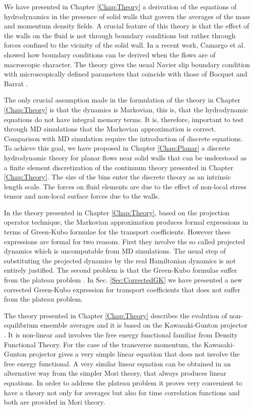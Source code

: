 \documentclass[b5paper,openright,11pt]{book}
\begin{document}
We  have presented  in  Chapter \ref{Chap:Theory}  a  derivation of  the
equations of hydrodynamics in the  presence of solid walls that govern
the  averages of  the  mass  and momentum  density  fields. A  crucial
feature of this theory is that the effect of the walls on the fluid is
not through boundary conditions but  rather through forces confined to
the vicinity  of the solid wall.  In a recent work, Camargo et al. \cite{CamargoBC2018} showed  how  boundary  conditions  can  be  derived  when  the  flows  are  of
macroscopic  character.  The  theory  gives  the usual  Navier  slip
boundary  condition  with   microscopically  defined  parameters  that
coincide      with      those      of     Bocquet      and      Barrat
\cite{Bocquet1994}.

The only crucial  assumption made in the formulation of  the theory in
Chapter \ref{Chap:Theory} is  that the dynamics  is Markovian, this  is, that
the hydrodynamic equations do not  have integral memory terms.  It is,
therefore, important to test through MD simulations that the Markovian
approximation is  correct.  Comparison with MD  simulation require the
introduction  of discrete  equations. To  achieve this  goal, we  have
proposed in Chapter \ref{Chap:Planar} a  discrete hydrodynamic theory  for planar
flows near  solid walls  that can  be understood  as a  finite element
discretization of  the continuum  theory presented in Chapter \ref{Chap:Theory}.
The size of the bins enter  the discrete theory as an intrinsic length
scale. The forces on fluid elements are due to the effect of non-local
stress tensor and non-local surface forces due to the walls.

In the  theory presented in Chapter \ref{Chap:Theory}, based  on the
projection  operator technique,  the Markovian  approximation produces
formal expressions in  terms of Green-Kubo formulae  for the transport
coefficients.    However  these   expressions  are   formal  for   two
reasons. First they involve the  so called projected dynamics which is
uncomputable from MD  simulations. The usual step  of substituting the
projected dynamics  by the real  Hamiltonian dynamics is  not entirely
justified. The second  problem is that the  Green-Kubo formulae suffer
from the plateau problem \cite{Kirkwood1949,Espanol1992}.  
In Sec. \ref{Sec:CorrectedGK} we have  presented a   new  corrected   Green-Kubo  expression   for  transport
coefficients that does not suffer from the plateau problem.

The  theory presented  in Chapter \ref{Chap:Theory} describes  the
evolution of non-equilibrium ensemble averages  and it is based on the
Kawasaki-Gunton  projector \cite{Grabert1982}.   It is  non-linear and
involves the  free energy functional familiar  from Density Functional
Theory.  For the case of  the transverse momentum, the Kawasaki-Gunton
projector gives  a very simple  linear equation that does  not involve
the free  energy functional.   A very similar  linear equation  can be
obtained  in an  alternative way  from the  simpler Mori  theory, that
always produces  linear equations.   In order  to address  the plateau
problem  it proves  very  convenient to  have a  theory  not only  for
averages but also for time correlation functions and both are provided
in Mori theory.  
\end{document}
